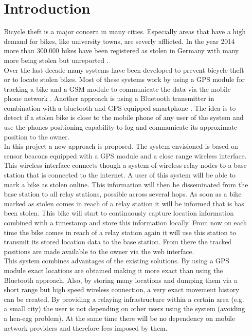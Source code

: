 \documentclass[a4paper]{article}
\begin{document}
\section{Introduction}
Bicycle theft is a major concern in many cities. Especially areas that have a high demand for bikes, like university towns, are severly afflicted. In the year 2014 more than 300.000 bikes have been registered as stolen in Germany with many more being stolen but unreported \cite{bka}.\\
Over the last decade many systems have been developed to prevent bicycle theft or to locate stolen bikes. Most of these systems work by using a GPS module for tracking a bike and a GSM module to communicate the data via the mobile phone network \cite{golembike}. Another approach is using a Bluetooth transmitter in combination with a bluetooth and GPS equipped smartphone \cite{leash}. The idea is to detect if a stolen bike is close to the mobile phone of any user of the system and use the phones positioning capability to log and communicate its approximate position to the owner.\\
In this project a new approach is proposed. The system envisioned is based on sensor beacons equipped with a GPS module and a close range wireless interface. This wireless interface connects though a system of wireless relay nodes to a base station that is connected to the internet. A user of this system will be able to mark a bike as stolen online. This information will then be disseminated from the base station to all relay stations, possible across several hops. As soon as a bike marked as stolen comes in reach of a relay station it will be informed that is has been stolen. This bike will start to continuously capture location information combined with a timestamp and store this information locally. From now on each time the bike comes in reach of a relay station again it will use this station to transmit its stored location data to the base station. From there the tracked positions are made available to the owner via the web interface.\\
This system combines advantages of the existing solutions. By using a GPS module exact locations are obtained making it more exact than using the Bluetooth approach. Also, by storing many locations and dumping them via a short range but high speed wireless connection, a very exact movement history can be created. By providing a relaying infrastructure within a certain area (e.g. a small city) the user is not depending on other users using the system (avoiding a hen-egg problem). At the same time there will be no dependency on mobile network providers and therefore fees imposed by them.\\
\end{document}
